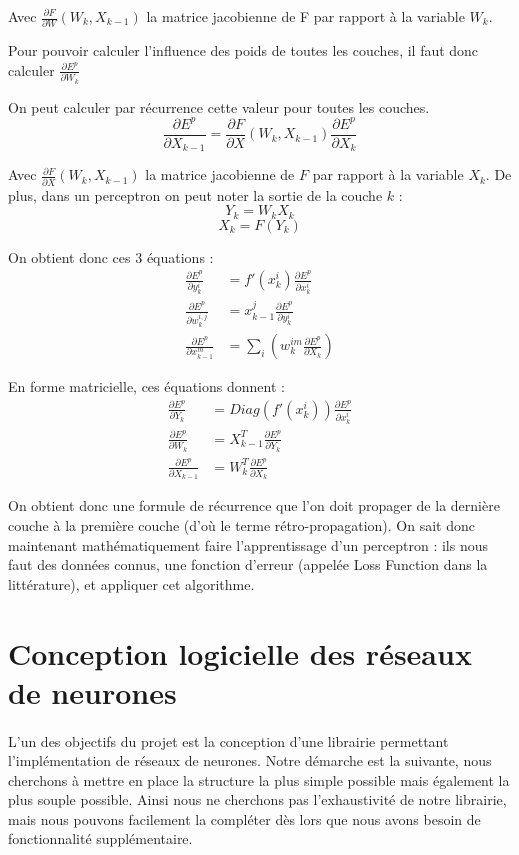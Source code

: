 Avec $\frac{\partial F}{\partial W}(W_k, X_{k-1})$ la matrice jacobienne de F par rapport à la variable $W_k$.

Pour pouvoir calculer l'influence des poids de toutes les couches, il faut donc calculer $\frac{\partial E^p}{\partial W_k}$

On peut calculer par récurrence cette valeur pour toutes les couches.
\[
	\frac{\partial E^p}{\partial X _{k-1}} = \frac{\partial F}{\partial X}(W_k, X_{k-1})\frac{\partial E^p}{\partial X_k}
\]

Avec $\frac{\partial F}{\partial X }(W_k, X_{k-1})$ la matrice jacobienne de $F$ par rapport à la variable $X_k$. De plus, dans un perceptron on peut noter la sortie de la couche $k$ : 
\[
Y_k = W_k X_k \]
\[
X_k = F(Y_k)
\]

On obtient donc ces 3 équations : 
\begin{align*}
\frac{\partial E^p}{\partial y_k^i} &= f'(x_k^i)\frac{\partial E^p}{\partial x_k^i} \\
\frac{\partial E^p}{\partial w_k^{i,j}}&= x^j_{k-1} \frac{\partial E^p}{\partial y_k^i}\\
\frac{\partial E^p}{\partial x_{k-1}^m} &= \sum_i(w_k^{im}\frac{\partial E^p}{\partial X_k})
\end{align*}

En forme matricielle, ces équations donnent :
\begin{align*}
\frac{\partial E^p}{\partial Y_k} &= Diag(f'(x_k^i))\frac{\partial E^p}{\partial x_k^i} \\
\frac{\partial E^p}{\partial W_k}&= X^T_{k-1} \frac{\partial E^p}{\partial Y_k}\\
\frac{\partial E^p}{\partial X_{k-1}} &= W_k^T\frac{\partial E^p}{\partial X_k}
\end{align*}

On obtient donc une formule de récurrence que l'on doit propager de la dernière couche à la première couche (d'où le terme rétro-propagation). On sait donc maintenant mathématiquement faire l'apprentissage d'un perceptron : ils nous faut des données connus, une fonction d'erreur (appelée Loss Function dans la littérature), et appliquer cet algorithme.


\section{Conception logicielle des réseaux de neurones}
\paragraph*{} %
L'un des objectifs du projet est la conception d'une librairie permettant l'implémentation de réseaux de neurones. Notre démarche est la suivante, nous cherchons à mettre en place la structure la plus simple possible mais également la plus souple possible. Ainsi nous ne cherchons pas l'exhaustivité de notre librairie, mais nous pouvons facilement la compléter dès lors que nous avons besoin de fonctionnalité supplémentaire.

